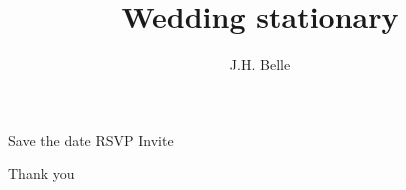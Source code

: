 \documentclass{article}
\begin{document}
\title{Wedding stationary}
\author{J.H. Belle}
\maketitle
\clearpage
Save the date 
\clearpage
RSVP
\clearpage
Invite

\clearpage
Thank you
\end{document}
